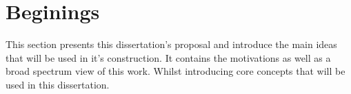 \chapter{Beginings}

This section presents this dissertation's proposal and introduce the main ideas that will be used in it's construction. It contains the motivations as well as a broad spectrum view of this work. Whilst introducing core concepts that will be used in this dissertation.




